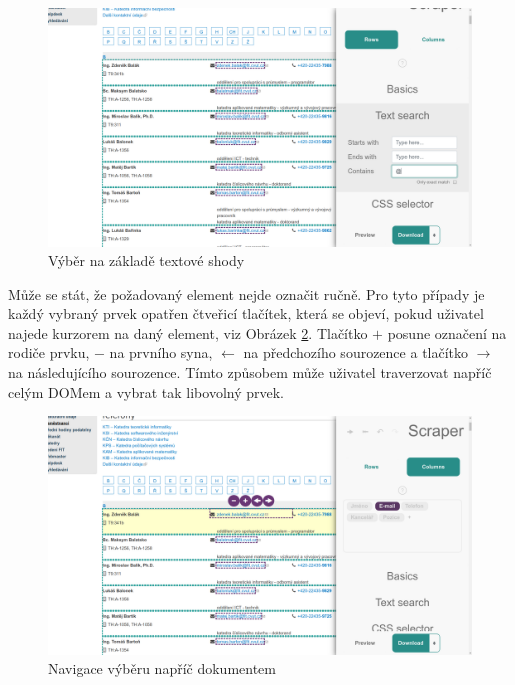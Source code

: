 \documentclass[thesis=B,czech]{FITthesis2}[2012/06/26]
\begin{document}
	\begin{figure}[h]
		\includegraphics[width=\linewidth]{images/Scraper_text_search.png}
		\caption{Výběr na základě textové shody}
		\label{fig:scraper_text_search}
	\end{figure}

	Může se stát, že požadovaný element nejde označit ručně. Pro tyto případy je každý vybraný prvek opatřen čtveřicí tlačítek, která se objeví, pokud uživatel najede kurzorem na daný element, viz Obrázek \ref{fig:scraper_dom_navigation}. Tlačítko \textsf{$+$} posune označení na rodiče prvku, \textsf{$-$} na prvního syna, \textsf{$\leftarrow$} na předchozího sourozence a tlačítko \textsf{$\rightarrow$} na následujícího sourozence. Tímto způsobem může uživatel traverzovat napříč celým DOMem a vybrat tak libovolný prvek.
	\begin{figure}[h]
		\includegraphics[width=\linewidth]{images/Scraper_dom_navigation.png}
		\caption{Navigace výběru napříč dokumentem}
		\label{fig:scraper_dom_navigation}
	\end{figure}
\end{document}
